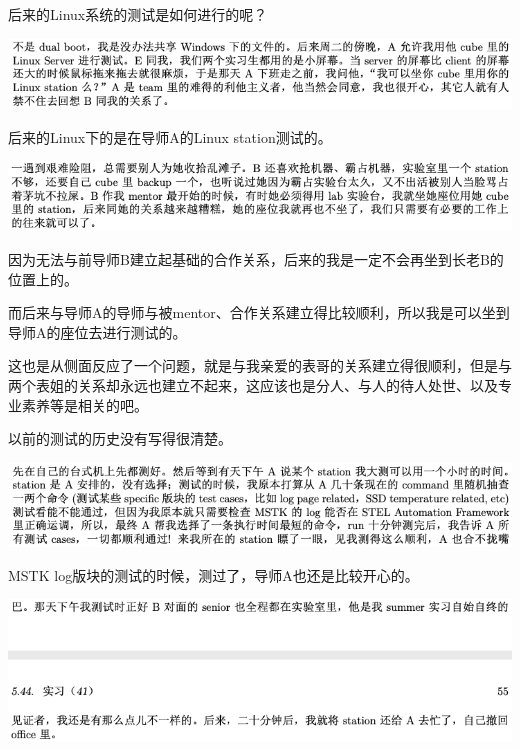 \documentclass[9pt, b5paper]{article}
\begin{document}
后来的Linux系统的测试是如何进行的呢？

\begin{center}
\includegraphics[width=.9\linewidth]{./pic/backups_plans_20210514_120348.png}
\end{center}

后来的Linux下的是在导师A的Linux station测试的。

\begin{center}
\includegraphics[width=.9\linewidth]{./pic/backups_plans_20210514_120603.png}
\end{center}

因为无法与前导师B建立起基础的合作关系，后来的我是一定不会再坐到长老B的位置上的。 

而后来与导师A的导师与被mentor、合作关系建立得比较顺利，所以我是可以坐到导师A的座位去进行测试的。

这也是从侧面反应了一个问题，就是与我亲爱的表哥的关系建立得很顺利，但是与两个表姐的关系却永远也建立不起来，这应该也是分人、与人的待人处世、以及专业素养等是相关的吧。 

以前的测试的历史没有写得很清楚。 

\begin{center}
\includegraphics[width=.9\linewidth]{./pic/backups_plans_20210514_121052.png}
\end{center}

MSTK log版块的测试的时候，测过了，导师A也还是比较开心的。 

\begin{center}
\includegraphics[width=.9\linewidth]{./pic/backups_plans_20210514_121200.png}
\end{center}
\end{document}
